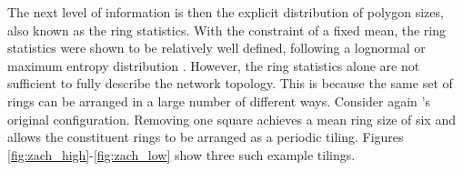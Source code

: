 The next level of information is then the explicit distribution of polygon sizes, also known as the ring statistics.
With the constraint of a fixed mean, the ring statistics were shown to be relatively well defined, following a lognormal or maximum entropy distribution \cite{Shackelford1981,Lemaitre1993,Lichtenstein2012}.
However, the ring statistics alone are not sufficient to fully describe the network topology. 
This is because the same set of rings can be arranged in a large number of different ways.
Consider again \zach's original configuration. 
Removing one square achieves a mean ring size of six and allows the constituent rings to be arranged as a periodic tiling.
Figures \ref{fig:zach_high}\--\ref{fig:zach_low} show three such example tilings.


\begin{figure}[h]
     \centering
     

\end{figure}
